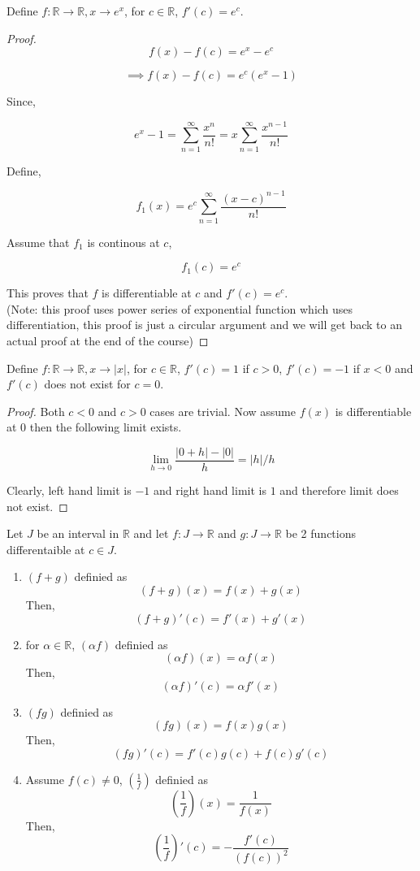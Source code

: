 \documentclass[11pt,a4paper]{colorart}
\def\l{\left}
\def\r{\right}
\def\R{\mathbb{R}}
\def\a{\alpha}
\def\ra{\rightarrow}
\begin{document}
\begin{example}
	Define $f: \R \ra \R, x \ra e^x$, for $c \in \R$, $f'(c) = e^c$.
\end{example}
	
\begin{proof}
	
	\[ f(x) - f(c) = e^x - e^c \]

	\[ \implies f(x) - f(c) = e^c \l( e^x - 1 \r) \]

	Since, 
	
	\[ e^x -1 = \sum_{n=1}^{\infty} \frac{ x^n }{ n! } = x \sum_{n=1}^{\infty} \frac{ x^{n-1} }{ n! } \]

	Define,

	\[ f_1(x) = e^c \sum_{n=1}^{\infty} \frac{ (x-c)^{n-1} }{ n! } \]

	Assume that $f_1$ is continous at $c$,

	\[ f_1(c) = e^c \]

	This proves that $f$ is differentiable at $c$ and $f'(c) = e^c$.\\

	(Note: this proof uses power series of exponential function which uses differentiation, this proof is just a circular argument and we will get back to an actual proof at the end of the course)

\end{proof}

\begin{example}
	Define $f: \R \ra \R, x \ra |x|$, for $c \in \R$, $f'(c) = 1$ if $c>0$, $f'(c) = -1$ if $x<0$ and $f'(c)$ does not exist for $c=0$.
\end{example}

\begin{proof}
	Both $c<0$ and $c>0$ cases are trivial. Now assume $f(x)$ is differentiable at 0 then the following limit exists.
	
	\[ \lim_{ h \to 0 } \frac{ |0+h| -|0| }{ h } = |h|/h \]
	
	Clearly, left hand limit is $-1$ and right hand limit is $1$ and therefore limit does not exist.

\end{proof}

\begin{theorem}
	Let $J$ be an interval in $\R$ and let $f:J \ra \R$ and $g:J \ra \R$ be 2 functions differentaible at $c\in J$.
	\begin{enumerate}
		\item $(f+g)$ definied as 
			\[ (f+g)(x) = f(x) + g(x) \] 
			Then,
			\[ (f+g)'(c) = f'(x) + g'(x) \]
		\item for $\a \in \R$, $(\a f)$ definied as 
			\[ (\a f)(x)=\a f(x) \]
			Then,
			\[ (\a f)'(c)=\a f'(x) \]
		\item $(fg)$ definied as 
			\[ (fg)(x)=f(x)g(x)\] 
			Then,
			\[ (fg)'(c)=f'(c)g(c)+f(c)g'(c) \]
		\item Assume $f(c)\neq 0$, $(\frac{1}{f})$ definied as 
			\[ \l(\frac{1}{f}\r)(x) = \frac{1}{f(x)} \]
			Then,
			\[ \l(\frac{1}{f}\r)'(c) = -\frac{f'(c)}{(f(c))^2} \]
	\end{enumerate}
\end{theorem}
\end{document}
